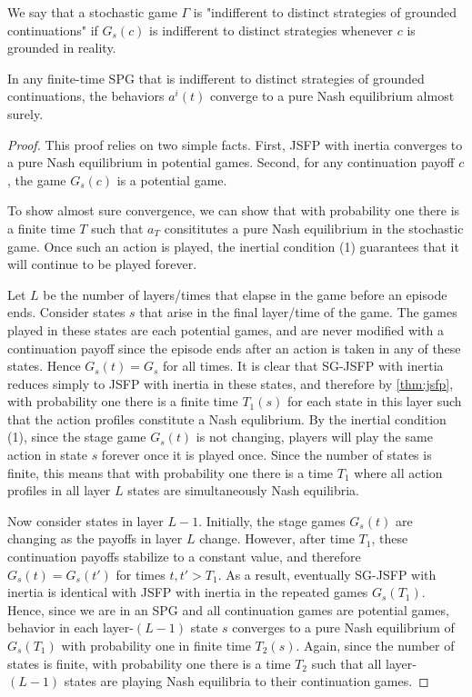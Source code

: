 \begin{mydef}
We say that a stochastic game $\Gamma$ is "indifferent to distinct strategies of grounded continuations" if $G_s(c)$ is indifferent to distinct strategies whenever $c$ is grounded in reality.
\end{mydef}

\begin{thm}
In any finite-time SPG that is indifferent to distinct strategies of grounded continuations, the behaviors $a^i(t)$ converge to a pure Nash equilibrium almost surely.
\label{thm:spgjsfp}
\end{thm}

\begin{proof}

This proof relies on two simple facts. First, JSFP with inertia converges to a pure Nash equilibrium in potential games. Second, for any continuation payoff $c$, the game $G_s(c)$ is a potential game.

To show almost sure convergence, we can show that with probability one there is a finite time $T$ such that $a_T$ consititutes a pure Nash equilibrium in the stochastic game. Once such an action is played, the inertial condition (1) guarantees that it will continue to be played forever.

Let $L$ be the number of layers/times that elapse in the game before an episode ends. Consider states $s$ that arise in the final layer/time of the game. The games played in these states are each potential games, and are never modified with a continuation payoff since the episode ends after an action is taken in any of these states. Hence $G_s(t) = G_s$ for all times. It is clear that SG-JSFP with inertia reduces simply to JSFP with inertia in these states, and therefore by \ref{thm:jsfp}, with probability one there is a finite time $T_1(s)$ for each state in this layer such that the action profiles constitute a Nash equlibrium. By the inertial condition (1), since the stage game $G_s(t)$ is not changing, players will play the same action in state $s$ forever once it is played once. Since the number of states is finite, this means that with probability one there is a time $T_1$ where all action profiles in all layer $L$ states are simultaneously Nash equilibria.

Now consider states in layer $L-1$. Initially, the stage games $G_s(t)$ are changing as the payoffs in layer $L$ change. However, after time $T_1$, these continuation payoffs stabilize to a constant value, and therefore $G_s(t) = G_s(t')$ for times $t, t' > T_1$. As a result, eventually SG-JSFP with inertia is identical with JSFP with inertia in the repeated games $G_s(T_1)$. Hence, since we are in an SPG and all continuation games are potential games, behavior in each layer-$(L-1)$ state $s$ converges to a pure Nash equilibrium of $G_s(T_1)$ with probability one in finite time $T_2(s)$. Again, since the number of states is finite, with probability one there is a time $T_2$ such that all layer-$(L-1)$ states are playing Nash equilibria to their continuation games.


\end{proof}
